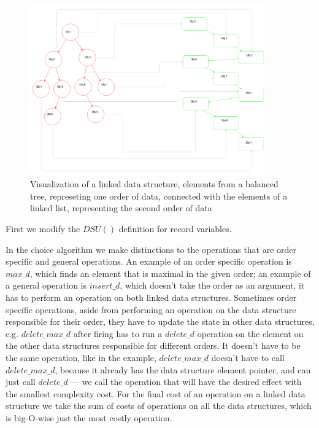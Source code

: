 \documentclass[a4paper,11pt]{article}
\begin{document}
            \begin{figure}[h!]
                \begin{center}
                    \includegraphics[width=0.9\textwidth]{thesis-pics/linked-dses.png}
                \end{center}

				\caption{Visualization of a linked data structure, elements from a balanced tree, represeting one order of data,
                 connected with the elements of a linked list, representing the second order of data}
				\label{fig:linked-data-structures}
			\end{figure}

            First we modify the $DSU()$ definition for record variables.

            In the choice algorithm we make distinctions to the operations that are order specific and general
            operations. An example of an order specific operation is $max\_d$, which finds an element that is maximal in
            the given order; an example of a general operation is $insert\_d$, which doesn't take the order as an
            argument, it has to perform an operation on both linked data structures. Sometimes order specific
            operations, aside from performing an operation on the data structure responsible for their order, they have
            to update the state in other data structures, e.g. $delete\_max\_d$ after firing has to run a $delete\_d$
            operation on the element on the other data structures responsible for different orders. It doesn't have to
            be the same operation, like in the example, $delete\_max\_d$ doesn't have to call $delete\_max\_d$, because
            it already has the data structure element pointer, and can just call $delete\_d$ --- we call the operation
            that will have the desired effect with the smallest complexity cost. For the final cost of an operation on a
            linked data structure we take the sum of costs of operations on all the data structures, which is
            big-O-wise just the most costly operation.
\end{document}
